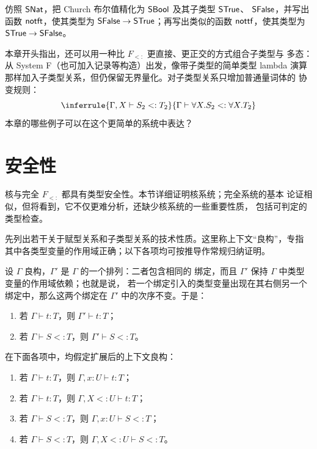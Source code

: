 \begin{exercise}
\label{ex:26.3.5}
仿照 \(\mathsf{SNat}\)，把 Church 布尔值精化为
\(\mathsf{SBool}\) 及其子类型 \(\mathsf{STrue}\)、
\(\mathsf{SFalse}\)，并写出函数 \(\mathsf{notft}\)，使其类型为
\(\mathsf{SFalse}\to\mathsf{STrue}\)；再写出类似的函数
\(\mathsf{nottf}\)，使其类型为
\(\mathsf{STrue}\to\mathsf{SFalse}\)。
\end{exercise}

\begin{exercise}[\(\star\)]
\label{ex:26.3.6}
本章开头指出，还可以用一种比 \(F_{<:}\) 更直接、更正交的方式组合子类型与
多态：从 System F（也可加入记录等构造）出发，像带子类型的简单类型 lambda
演算那样加入子类型关系，但仍保留无界量化。对子类型关系只增加普通量词体的
协变规则：
\[
\inferrule
 {\Gamma,X\vdash S_2<:T_2}
 {\Gamma\vdash\forall X.S_2<:\forall X.T_2}
\]
本章的哪些例子可以在这个更简单的系统中表达？
\end{exercise}

\section{安全性}
\label{sec:26.4}

核与完全 \(F_{<:}\) 都具有类型安全性。本节详细证明核系统；完全系统的基本
论证相似，但将看到，它不仅更难分析，还缺少核系统的一些重要性质，
包括可判定的类型检查。

先列出若干关于赋型关系和子类型关系的技术性质。这里称上下文“良构”，专指
其中各类型变量的作用域正确；以下各项均可按推导作常规归纳证明。

\begin{lemma}[排列]
\label{lem:26.4.1}
设 \(\Gamma\) 良构，\(\Gamma'\) 是 \(\Gamma\) 的一个排列：二者包含相同的
绑定，而且 \(\Gamma'\) 保持 \(\Gamma\) 中类型变量的作用域依赖；也就是说，
若一个绑定引入的类型变量出现在其右侧另一个绑定中，那么这两个绑定在
\(\Gamma'\) 中的次序不变。于是：
\begin{enumerate}
  \item 若 \(\Gamma\vdash t:T\)，则 \(\Gamma'\vdash t:T\)；
  \item 若 \(\Gamma\vdash S<:T\)，则 \(\Gamma'\vdash S<:T\)。
\end{enumerate}
\end{lemma}

\begin{lemma}[弱化]
\label{lem:26.4.2}
在下面各项中，均假定扩展后的上下文良构：
\begin{enumerate}
  \item 若 \(\Gamma\vdash t:T\)，则 \(\Gamma,x:U\vdash t:T\)；
  \item 若 \(\Gamma\vdash t:T\)，则 \(\Gamma,X<:U\vdash t:T\)；
  \item 若 \(\Gamma\vdash S<:T\)，则 \(\Gamma,x:U\vdash S<:T\)；
  \item 若 \(\Gamma\vdash S<:T\)，则 \(\Gamma,X<:U\vdash S<:T\)。
\end{enumerate}
\end{lemma}

